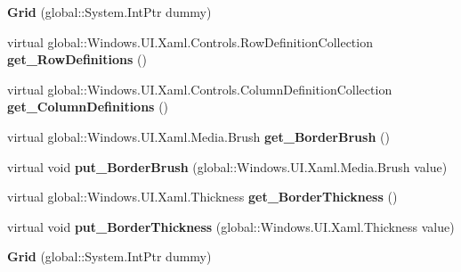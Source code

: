 \begin{DoxyCompactItemize}
{\bfseries Grid} (global\+::\+System.\+Int\+Ptr dummy)
\item 
\mbox{\label{class_windows_1_1_u_i_1_1_xaml_1_1_controls_1_1_grid_a462adf0bcc5ff89fd6198b69ea3935aa}} 
virtual global\+::\+Windows.\+U\+I.\+Xaml.\+Controls.\+Row\+Definition\+Collection {\bfseries get\+\_\+\+Row\+Definitions} ()
\item 
\mbox{\label{class_windows_1_1_u_i_1_1_xaml_1_1_controls_1_1_grid_a4e77f5fdadc303d53031e20fcabf5fc6}} 
virtual global\+::\+Windows.\+U\+I.\+Xaml.\+Controls.\+Column\+Definition\+Collection {\bfseries get\+\_\+\+Column\+Definitions} ()
\item 
\mbox{\label{class_windows_1_1_u_i_1_1_xaml_1_1_controls_1_1_grid_a56ab844ebf9b8faa820b652c2c5e592b}} 
virtual global\+::\+Windows.\+U\+I.\+Xaml.\+Media.\+Brush {\bfseries get\+\_\+\+Border\+Brush} ()
\item 
\mbox{\label{class_windows_1_1_u_i_1_1_xaml_1_1_controls_1_1_grid_a27800ef05d364a3b9417b09943ae92bf}} 
virtual void {\bfseries put\+\_\+\+Border\+Brush} (global\+::\+Windows.\+U\+I.\+Xaml.\+Media.\+Brush value)
\item 
\mbox{\label{class_windows_1_1_u_i_1_1_xaml_1_1_controls_1_1_grid_ae403f1f4e529c68e04423bf21fc36cc7}} 
virtual global\+::\+Windows.\+U\+I.\+Xaml.\+Thickness {\bfseries get\+\_\+\+Border\+Thickness} ()
\item 
\mbox{\label{class_windows_1_1_u_i_1_1_xaml_1_1_controls_1_1_grid_a7ec7f388cb8d2882e412b29d60fb8e78}} 
virtual void {\bfseries put\+\_\+\+Border\+Thickness} (global\+::\+Windows.\+U\+I.\+Xaml.\+Thickness value)
\item 
\mbox{\label{class_windows_1_1_u_i_1_1_xaml_1_1_controls_1_1_grid_a8a9435e4defeeee271d7eef51280e839}} 
{\bfseries Grid} (global\+::\+System.\+Int\+Ptr dummy)
\item 
\mbox{\label{class_windows_1_1_u_i_1_1_xaml_1_1_controls_1_1_grid_a462adf0bcc5ff89fd6198b69ea3935aa}} 

\end{DoxyCompactItemize}
